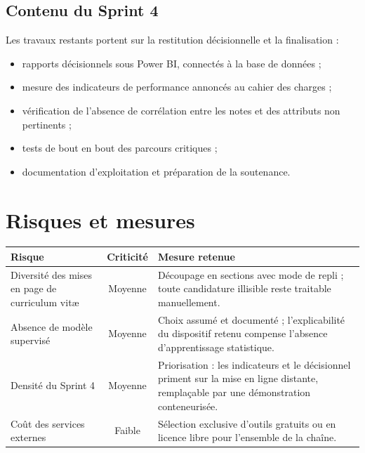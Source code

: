 \documentclass[11pt,a4paper]{article}
\begin{document}
\subsection{Contenu du Sprint 4}
Les travaux restants portent sur la restitution décisionnelle et la finalisation :
\begin{itemize}[leftmargin=1.5em, nosep]
  \item rapports décisionnels sous Power BI, connectés à la base de données ;
  \item mesure des indicateurs de performance annoncés au cahier des charges ;
  \item vérification de l'absence de corrélation entre les notes et des attributs non pertinents ;
  \item tests de bout en bout des parcours critiques ;
  \item documentation d'exploitation et préparation de la soutenance.
\end{itemize}

\section{Risques et mesures}

\begin{center}
\small
\begin{tabular}{p{4.6cm}cp{7.4cm}}
  \toprule
  \textbf{Risque} & \textbf{Criticité} & \textbf{Mesure retenue} \\
  \midrule
  Diversité des mises en page de curriculum vitæ & Moyenne & Découpage en sections avec mode de repli ; toute candidature illisible reste traitable manuellement. \\[1mm]
  Absence de modèle supervisé & Moyenne & Choix assumé et documenté ; l'explicabilité du dispositif retenu compense l'absence d'apprentissage statistique. \\[1mm]
  Densité du Sprint 4 & Moyenne & Priorisation : les indicateurs et le décisionnel priment sur la mise en ligne distante, remplaçable par une démonstration conteneurisée. \\[1mm]
  Coût des services externes & Faible & Sélection exclusive d'outils gratuits ou en licence libre pour l'ensemble de la chaîne. \\
  \bottomrule
\end{tabular}
\end{center}
\end{document}
